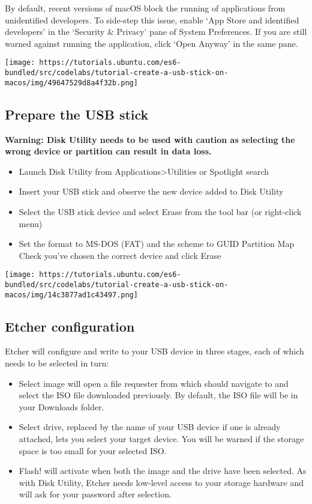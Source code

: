 By default, recent versions of macOS block the running of applications
from unidentified developers. To side-step this issue, enable `App Store
and identified developers' in the `Security \& Privacy' pane of System
Preferences. If you are still warned against running the application,
click `Open Anyway' in the same pane.

\texttt{[image: https://tutorials.ubuntu.com/es6-bundled/src/codelabs/tutorial-create-a-usb-stick-on-macos/img/49647529d8a4f32b.png]}

\hypertarget{prepare-the-usb-stick}{%
\subsection{Prepare the USB stick}\label{prepare-the-usb-stick}}

\textbf{Warning: Disk Utility needs to be used with caution as selecting
the wrong device or partition can result in data loss.}

\begin{itemize}
\tightlist
\item
  Launch Disk Utility from Applications\textgreater{}Utilities or
  Spotlight search
\item
  Insert your USB stick and observe the new device added to Disk Utility
\item
  Select the USB stick device and select Erase from the tool bar (or
  right-click menu)
\item
  Set the format to MS-DOS (FAT) and the scheme to GUID Partition Map
  Check you've chosen the correct device and click Erase
\end{itemize}

\texttt{[image: https://tutorials.ubuntu.com/es6-bundled/src/codelabs/tutorial-create-a-usb-stick-on-macos/img/14c3877ad1c43497.png]}

\hypertarget{etcher-configuration}{%
\subsection{Etcher configuration}\label{etcher-configuration}}

Etcher will configure and write to your USB device in three stages, each
of which needs to be selected in turn:

\begin{itemize}
\tightlist
\item
  Select image will open a file requester from which should navigate to
  and select the ISO file downloaded previously. By default, the ISO
  file will be in your Downloads folder.
\item
  Select drive, replaced by the name of your USB device if one is
  already attached, lets you select your target device. You will be
  warned if the storage space is too small for your selected ISO.
\item
  Flash! will activate when both the image and the drive have been
  selected. As with Disk Utility, Etcher needs low-level access to your
  storage hardware and will ask for your password after selection.
\end{itemize}

